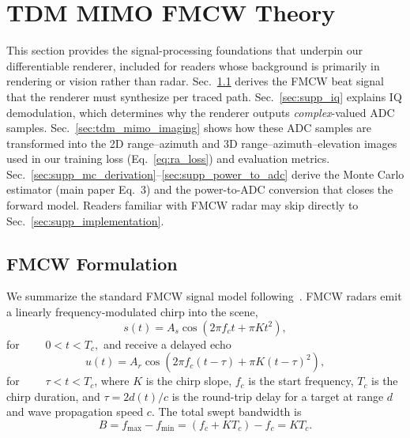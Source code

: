 \section{TDM MIMO FMCW Theory}
\label{sec:rationale}

This section provides the signal-processing foundations that underpin our differentiable renderer, included for readers whose background is primarily in rendering or vision rather than radar.
Sec.~\ref{sec:supp_fmcw} derives the FMCW beat signal that the renderer must synthesize per traced path.
Sec.~\ref{sec:supp_iq} explains IQ demodulation, which determines why the renderer outputs \emph{complex}-valued ADC samples.
Sec.~\ref{sec:tdm_mimo_imaging} shows how these ADC samples are transformed into the 2D range--azimuth and 3D range--azimuth--elevation images used in our training loss (Eq.~\ref{eq:ra_loss}) and evaluation metrics.
Sec.~\ref{sec:supp_mc_derivation}--\ref{sec:supp_power_to_adc} derive the Monte Carlo estimator (main paper Eq.~3) and the power-to-ADC conversion that closes the forward model.
Readers familiar with FMCW radar may skip directly to Sec.~\ref{sec:supp_implementation}.

\subsection{FMCW Formulation}
\label{sec:supp_fmcw}

We summarize the standard FMCW signal model following~\cite{skolnik2001introduction,dudek2010millimeter}. FMCW radars emit a linearly frequency-modulated chirp into the scene,
\begin{equation}
    s(t) = A_s \cos\!\left(2\pi f_c t + \pi K t^2 \right), 
\end{equation}
for $\qquad 0 < t < T_c,$ and receive a delayed echo
\begin{equation}
    u(t) = A_r \cos\!\left(2\pi f_c (t-\tau) + \pi K (t-\tau)^2 \right), 
\end{equation}
for $\qquad \tau < t < T_c$, where $K$ is the chirp slope, $f_c$ is the start frequency, $T_c$ is the chirp duration, and $\tau = 2 d(t)/c$ is the round-trip delay for a target at range $d$ and wave propagation speed $c$. The total swept bandwidth is
\begin{equation}
    B = f_{\max} - f_{\min} = (f_c + K T_c) - f_c = K T_c.
\end{equation}

